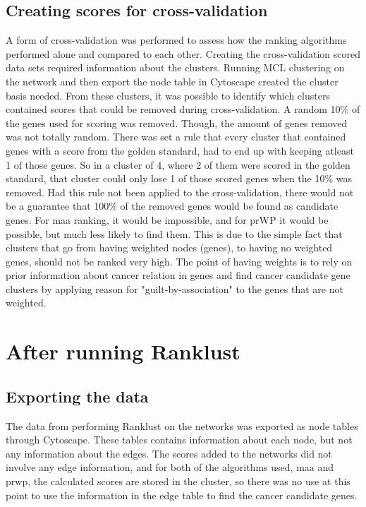 \subsection{Creating scores for cross-validation}
A form of cross-validation was performed to assess how the ranking algorithms
performed alone and compared to each other. Creating the cross-validation scored
data sets required information about the clusters. Running MCL clustering on the
network and then export the node table in Cytoscape created the cluster basis
needed. From these clusters, it was possible to identify which clusters
contained scores that could be removed during cross-validation. A random 10\% of
the genes used for scoring was removed. Though, the amount of genes removed was
not totally random. There was set a rule that every cluster that contained genes
with a score from the golden standard, had to end up with keeping atleast 1 of
those genes. So in a cluster of 4, where 2 of them were scored in the golden
standard, that cluster could only lose 1 of those scored genes when the 10\% was
removed. Had this rule not been applied to the cross-validation, there would not
be a guarantee that 100\% of the removed genes would be found as candidate
genes. For \gls{maa} ranking, it would be impossible, and for \gls{pr}WP it
would be possible, but much less likely to find them. This is due to the simple
fact that clusters that go from having weighted nodes (genes), to having no
weighted genes, should not be ranked very high. The point of having weights is
to rely on prior information about cancer relation in genes and find cancer
candidate gene clusters by applying reason for "guilt-by-association" to the
genes that are not weighted.

\section{After running Ranklust}
\subsection{Exporting the data}
The data from performing Ranklust on the networks was exported as node tables
through Cytoscape. These tables contains information about each node, but not
any information about the edges. The scores added to the networks did not
involve any edge information, and for both of the algorithms used, \gls{maa} and
\gls{prwp}, the calculated scores are stored in the cluster, so there was no use
at this point to use the information in the edge table to find the cancer
candidate genes.


